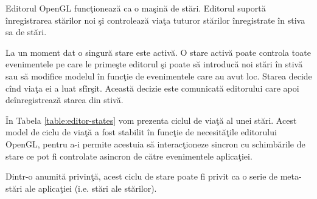 Editorul OpenGL funcţionează ca o maşină de stări. Editorul suportă
înregistrarea stărilor noi şi controlează viaţa tuturor stărilor înregistrate în
stiva sa de stări.

La un moment dat o singură stare este activă. O stare activă poate controla
toate evenimentele pe care le primeşte editorul şi poate să introducă noi stări
în stivă sau să modifice modelul în funcţie de evenimentele care au avut loc.
Starea decide cînd viaţa ei a luat sfîrşit. Această decizie este comunicată
editorului care apoi deînregistrează starea din stivă.

În Tabela \ref{table:editor-states} vom prezenta ciclul de viaţă al unei stări.
Acest model de ciclu de viaţă a fost stabilit în funcţie de necesităţile
editorului OpenGL, pentru a-i permite acestuia să interacţioneze sincron cu
schimbările de stare ce pot fi controlate asincron de către evenimentele
aplicaţiei.

Dintr-o anumită privinţă, acest ciclu de stare poate fi privit ca o
serie de meta-stări ale aplicaţiei (i.e. stări ale stărilor).

